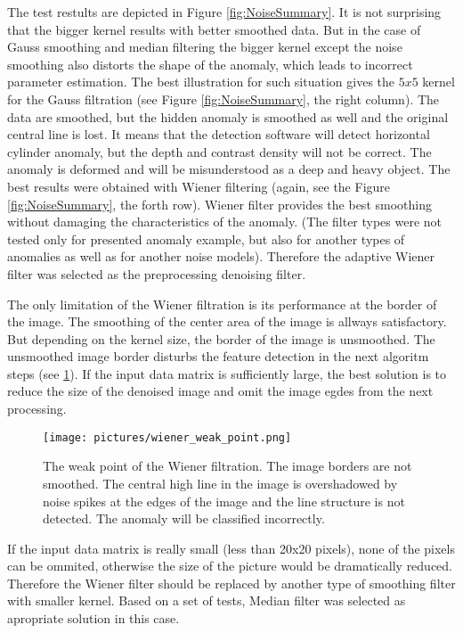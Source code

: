 \documentclass[FM]{tulthesis}
\begin{document}
The test restults are depicted in Figure \ref{fig:NoiseSummary}. It is not surprising that the bigger kernel results with better smoothed data. But in the case of Gauss smoothing and median filtering the bigger kernel except the noise smoothing also distorts the shape of the anomaly, which leads to incorrect parameter estimation. The best illustration for such situation gives the $5x5$ kernel for the Gauss filtration (see Figure \ref{fig:NoiseSummary}, the right column). The data are smoothed, but the hidden anomaly is smoothed as well and the original central line is lost. It means that the detection software will detect horizontal cylinder anomaly, but the depth and contrast density will not be correct. The anomaly is deformed and will be misunderstood as a deep and heavy object. The best results were obtained with Wiener filtering (again, see the Figure \ref{fig:NoiseSummary}, the forth row). Wiener filter provides the best smoothing without damaging the characteristics of the anomaly. (The filter types were not tested only for presented anomaly example, but also for another types of anomalies as well as for another noise models). Therefore the adaptive Wiener filter was selected as the preprocessing denoising filter. 

The only limitation of the Wiener filtration is its performance at the border of the image. The smoothing of the center area of the image is allways satisfactory. But depending on the kernel size, the border of the image is unsmoothed. The unsmoothed image border disturbs the feature detection in the next algoritm steps (see \ref{fig:NoiseWienerWeak}). If the input data matrix is sufficiently large, the best solution is to reduce the size of the denoised image and omit the image egdes from the next processing. 

\begin{figure}[ht]
\renewcommand{\figurename}{Figure}
\centerline{\texttt{[image: pictures/wiener\_weak\_point.png]}}
\renewcommand{\figurename}{Figure}
\caption[Denoising with Wiener filer, weak points]{The weak point of the Wiener filtration. The image borders are not smoothed. The central high line in the image is overshadowed by noise spikes at the edges of the image and the line structure is not detected. The anomaly will be classified incorrectly.}
\label{fig:NoiseWienerWeak}
\end{figure}

If the input data matrix is really small (less than 20x20 pixels), none of the pixels can be ommited, otherwise the size of the picture would be dramatically reduced. Therefore the Wiener filter should be replaced by another type of smoothing filter with smaller kernel. Based on a set of tests, Median filter was selected as apropriate solution in this case.
\end{document}
